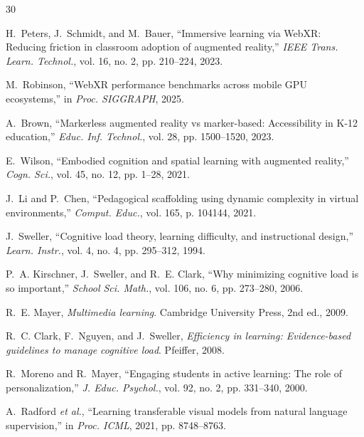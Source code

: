 \documentclass[conference]{IEEEtran}
\begin{document}
\balance


\begin{thebibliography}{30}

H.~Peters, J.~Schmidt, and M.~Bauer, ``Immersive learning via WebXR: Reducing friction in classroom adoption of augmented reality,'' \textit{IEEE Trans. Learn. Technol.}, vol. 16, no. 2, pp. 210--224, 2023.

M.~Robinson, ``WebXR performance benchmarks across mobile GPU ecosystems,'' in \textit{Proc. SIGGRAPH}, 2025.

A.~Brown, ``Markerless augmented reality vs marker-based: Accessibility in K-12 education,'' \textit{Educ. Inf. Technol.}, vol. 28, pp. 1500--1520, 2023.

E.~Wilson, ``Embodied cognition and spatial learning with augmented reality,'' \textit{Cogn. Sci.}, vol. 45, no. 12, pp. 1--28, 2021.

J.~Li and P.~Chen, ``Pedagogical scaffolding using dynamic complexity in virtual environments,'' \textit{Comput. Educ.}, vol. 165, p. 104144, 2021.

J.~Sweller, ``Cognitive load theory, learning difficulty, and instructional design,'' \textit{Learn. Instr.}, vol. 4, no. 4, pp. 295--312, 1994.

P.~A. Kirschner, J.~Sweller, and R.~E. Clark, ``Why minimizing cognitive load is so important,'' \textit{School Sci. Math.}, vol. 106, no. 6, pp. 273--280, 2006.

R.~E. Mayer, \textit{Multimedia learning}. Cambridge University Press, 2nd ed., 2009.

R.~C. Clark, F.~Nguyen, and J.~Sweller, \textit{Efficiency in learning: Evidence-based guidelines to manage cognitive load}. Pfeiffer, 2008.

R.~Moreno and R.~Mayer, ``Engaging students in active learning: The role of personalization,'' \textit{J. Educ. Psychol.}, vol. 92, no. 2, pp. 331--340, 2000.

A.~Radford \textit{et al.}, ``Learning transferable visual models from natural language supervision,'' in \textit{Proc. ICML}, 2021, pp. 8748--8763.


\end{thebibliography}
\end{document}
